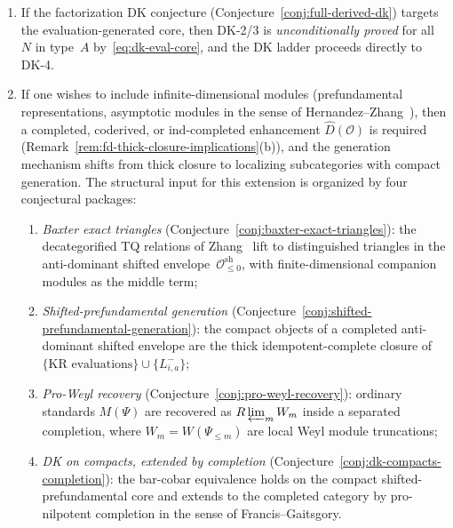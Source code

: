 \begin{remark}
\begin{enumerate}[label=\textup{(\alph*)}]
\item If the factorization DK conjecture
  \textup{(}Conjecture~\textup{\ref{conj:full-derived-dk}}\textup{)}
  targets the evaluation-generated core, then DK-2/3 is
  \emph{unconditionally proved} for all~$N$ in type~$A$
  by~\eqref{eq:dk-eval-core}, and the DK ladder proceeds
  directly to DK-4.
\item If one wishes to include infinite-dimensional
  modules \textup{(}prefundamental representations, asymptotic
  modules in the sense of Hernandez--Zhang~\cite{HJZ25}\textup{)}, then
  a completed, coderived, or ind-completed enhancement
  $\widehat{D}(\mathcal{O})$ is required
  \textup{(}Remark~\textup{\ref{rem:fd-thick-closure-implications}(b)}\textup{)},
  and the generation mechanism shifts from thick closure to
  localizing subcategories with compact generation.  The
  structural input for this extension is organized by four
  conjectural packages:
  \begin{enumerate}[label=\textup{(\roman*)}]
  \item \emph{Baxter exact triangles}
    \textup{(}Conjecture~\textup{\ref{conj:baxter-exact-triangles}}\textup{)}:
    the decategorified TQ relations of Zhang~\cite{Zhang24}
    lift to distinguished triangles in the anti-dominant shifted
    envelope~$\mathcal{O}^{\mathrm{sh}}_{\leq 0}$, with
    finite-dimensional companion modules as the middle term;
  \item \emph{Shifted-prefundamental generation}
    \textup{(}Conjecture~\textup{\ref{conj:shifted-prefundamental-generation}}\textup{)}:
    the compact objects of a completed anti-dominant shifted
    envelope are the thick idempotent-complete closure of
    $\{\text{KR evaluations}\} \cup \{L^-_{i,a}\}$;
  \item \emph{Pro-Weyl recovery}
    \textup{(}Conjecture~\textup{\ref{conj:pro-weyl-recovery}}\textup{)}:
    ordinary standards $M(\Psi)$ are recovered as
    $R\varprojlim_m W_m$ inside a separated completion, where
    $W_m = W(\Psi_{\leq m})$ are local Weyl module truncations;
  \item \emph{DK on compacts, extended by completion}
    \textup{(}Conjecture~\textup{\ref{conj:dk-compacts-completion}}\textup{)}:
    the bar-cobar equivalence holds on the compact shifted-prefundamental
    core and extends to the completed category by
    pro-nilpotent completion in the sense of
    Francis--Gaitsgory.
  \end{enumerate}

\end{enumerate}
\end{remark}
